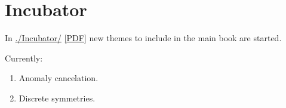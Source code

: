 \chapter{Incubator}



In \url{./Incubator/} \href{https://github.com/restrepo/beyond-the-standard-model/raw/master/Incubator/incubator.pdf}{[PDF]} new themes to include
in the main book are started.

Currently:

\begin{enumerate}
\item Anomaly cancelation.
\item Discrete symmetries.
\end{enumerate}

